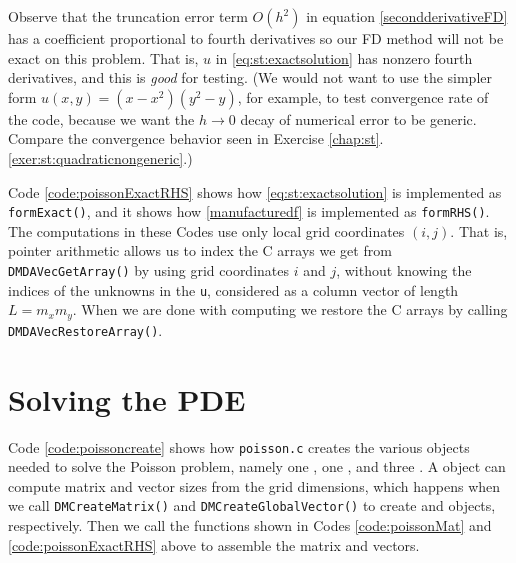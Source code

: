 Observe that the truncation error term $O(h^2)$ in equation \eqref{secondderivativeFD} has a coefficient proportional to fourth derivatives \citep{MortonMayers2005} so our FD method will not be exact on this problem.  That is, $u$ in \eqref{eq:st:exactsolution} has nonzero fourth derivatives, and this is \emph{good} for testing.  (We would not want to use the simpler form $u(x,y)=(x-x^2)(y^2-y)$, for example, to test convergence rate of the code, because we want the $h\to 0$ decay of numerical error to be generic.  Compare the convergence behavior seen in Exercise \ref{chap:st}.\ref{exer:st:quadraticnongeneric}.)

Code \ref{code:poissonExactRHS} shows how \eqref{eq:st:exactsolution} is implemented as \texttt{formExact()}, and it shows how \eqref{manufacturedf} is implemented as \texttt{formRHS()}.  The computations in these Codes use only local grid coordinates $(i,j)$.  That is, \PETSc pointer arithmetic allows us to index the C arrays we get from \texttt{DMDAVecGetArray()} by using grid coordinates $i$ and $j$, without knowing the indices of the unknowns in the \pVec \texttt{u}, considered as a column vector of length $L=m_x m_y$.  When we are done with computing \pVecs we restore the C arrays by calling \texttt{DMDAVecRestoreArray()}.



\section{Solving the PDE}

Code \ref{code:poissoncreate} shows how \texttt{poisson.c} creates the various objects needed to solve the Poisson problem, namely one \pDM, one \pMat, and three \pVecs.  A \pDM object can compute matrix and vector sizes from the grid dimensions, which happens when we call \texttt{DMCreateMatrix()} and \texttt{DMCreateGlobalVector()} to create \pMat and \pVec objects, respectively.  Then we call the functions shown in Codes \ref{code:poissonMat} and \ref{code:poissonExactRHS} above to assemble the matrix and vectors.


